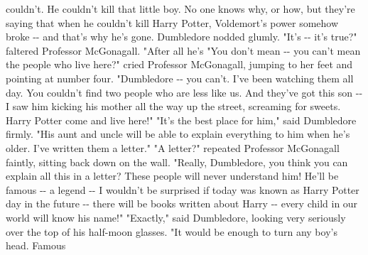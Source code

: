 \documentclass{article}%
\begin{document}
\newline%
couldn't. He couldn't kill that little boy. No one knows why, or how,
\newline%
but they're saying that when he couldn't kill Harry Potter, Voldemort's
\newline%
power somehow broke {-}{-} and that's why he's gone.
\newline%
Dumbledore nodded glumly.
\newline%
"It's {-}{-} it's true?" faltered Professor McGonagall. "After all he's
\newline%
"You don't mean {-}{-} you can't mean the people who live here?" cried
\newline%
Professor McGonagall, jumping to her feet and pointing at number four.
\newline%
"Dumbledore {-}{-} you can't. I've been watching them all day. You couldn't
\newline%
find two people who are less like us. And they've got this son {-}{-} I saw
\newline%
him kicking his mother all the way up the street, screaming for sweets.
\newline%
Harry Potter come and live here!"
\newline%
"It's the best place for him," said Dumbledore firmly. "His aunt and
\newline%
uncle will be able to explain everything to him when he's older. I've
\newline%
written them a letter."
\newline%
"A letter?" repeated Professor McGonagall faintly, sitting back down on
\newline%
the wall. "Really, Dumbledore, you think you can explain all this in a
\newline%
letter? These people will never understand him! He'll be famous {-}{-} a
\newline%
legend {-}{-} I wouldn't be surprised if today was known as Harry Potter day
\newline%
in the future {-}{-} there will be books written about Harry {-}{-} every child
\newline%
in our world will know his name!"
\newline%
"Exactly," said Dumbledore, looking very seriously over the top of his
\newline%
half{-}moon glasses. "It would be enough to turn any boy's head. Famous
\newline%
\end{document}
